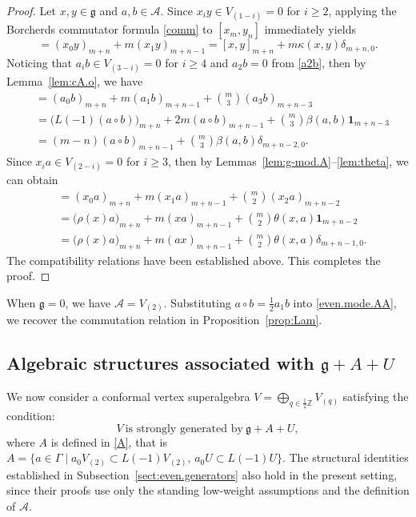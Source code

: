\documentclass[12pt]{article}
\numberwithin{equation}{section}
\theoremstyle{definition}
\theoremstyle{plain}
\newcommand{\bZ}{\ensuremath{\mathbb{Z}}}
\newcommand{\fg}{\mathfrak{g}}
\newcommand{\cA}{\ensuremath{\mathcal{A}}}
\newcommand{\bone}{\mathbf{1 }}
\begin{document}
\begin{proof}
     Let $x,y\in\fg$ and $a,b\in\cA$. Since $x_iy\in V_{(1-i)}=0$ for $i\ge 2$, applying the Borcherds commutator formula \eqref{comm} to $[x_m,y_n]$ immediately yields
    \begin{equation*}
        [x_m,y_n]=(x_0y)_{m+n}+m(x_1y)_{m+n-1}=[x,y]_{m+n}+m\kappa(x,y)\delta_{m+n,0}.
    \end{equation*}
    Noticing that $a_ib\in V_{(3-i)}=0$ for $i\ge4$ and $a_2b=0$ from \eqref{a2b}, then by Lemma~\ref{lem:cA.o}, we have
    \begin{align*}
        [a_m,b_n]&=(a_0b)_{m+n}+m(a_1b)_{m+n-1}+\binom{m}{3}(a_3b)_{m+n-3}\\
        &=\big(L(-1)(a\circ b)\big)_{m+n}+2m(a\circ b)_{m+n-1}+\binom{m}{3}\beta(a,b)\bone_{m+n-3}\\
        &=(m-n)(a\circ b)_{m+n-1}+\binom{m}{3}\beta(a,b)\delta_{m+n-2,0}.
    \end{align*}
    Since $x_ia\in V_{(2-i)}=0$ for $i\ge3$, then by Lemmas~\ref{lem:g-mod.A}--\ref{lem:theta}, we can obtain
    \begin{align*}
        [x_m,a_n]&=(x_0a)_{m+n}+m(x_1a)_{m+n-1}+\binom{m}{2}(x_2a)_{m+n-2}\\
        &=\big(\rho(x)a\big)_{m+n}+m(xa)_{m+n-1}+\binom{m}{2}\theta(x,a)\bone_{m+n-2}\\
        &=\big(\rho(x)a\big)_{m+n}+m(ax)_{m+n-1}+\binom{m}{2}\theta(x,a)\delta_{m+n-1,0}.
    \end{align*}
    The compatibility relations have been established above. This completes the proof.
\end{proof}

When $\fg=0$, we have $\cA=V_{(2)}$. Substituting $a\circ b=\frac12a_1b$ into \eqref{even.mode.AA}, we recover the commutation relation in Proposition~\ref{prop:Lam}.



\subsection{Algebraic structures associated with $\fg+A+U$}\label{sect:odd.generators}

\hspace{1.5em}We now consider a conformal vertex superalgebra $V=\bigoplus_{q\in\frac{1}{2}\bZ}V_{(q)}$ satisfying the condition:
\begin{equation}\label{assumption}
    V\ \text{is strongly generated by}\ \fg+A+U,
\end{equation}
where $A$ is defined in \eqref{A}, that is $A=\{a\in\Gamma \mid  a_0V_{(2)}\subset L(-1)V_{(2)},\, a_0U\subset L(-1)U\}$. The structural identities established in Subsection~\ref{sect:even.generators} also hold in the present setting, since their proofs use only the standing low-weight assumptions and the definition of $\cA$.
\end{document}
